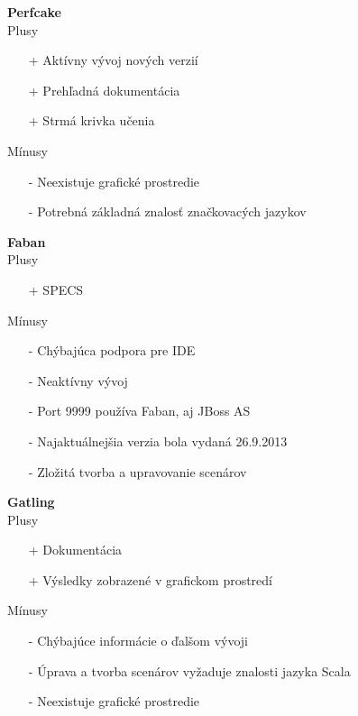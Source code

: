\documentclass[12pt,oneside,final]{fithesis-utf8}
\begin{document}
\noindent \textbf{Perfcake}
\newline \\
Plusy
\begin{itemize}
\item[+] Aktívny vývoj nových verzií
\item[+] Prehľadná dokumentácia
\item[+] Strmá krivka učenia \\
\end{itemize}

\newpage

\noindent Mínusy
\begin{itemize}
\item[-] Neexistuje grafické prostredie
\item[-] Potrebná základná znalosť značkovacých jazykov \\
\end{itemize}

\noindent \textbf{Faban}
\newline \\
Plusy
\begin{itemize}
\item[+] SPECS
\end{itemize}

\noindent Mínusy
\begin{itemize}
\item[-] Chýbajúca podpora pre IDE
\item[-] Neaktívny vývoj
\item[-] Port 9999 používa Faban, aj JBoss AS
\item[-] Najaktuálnejšia verzia bola vydaná 26.9.2013 
\item[-] Zložitá tvorba a upravovanie scenárov \\
\end{itemize}


\noindent \textbf{Gatling}
\newline \\
Plusy
\begin{itemize}
\item[+] Dokumentácia
\item[+] Výsledky zobrazené v grafickom prostredí
\end{itemize}

\noindent Mínusy
\begin{itemize}
\item[-] Chýbajúce informácie o ďalšom vývoji
\item[-] Úprava a tvorba scenárov vyžaduje znalosti jazyka Scala
\item[-] Neexistuje grafické prostredie \\
\end{itemize}




\end{document}
